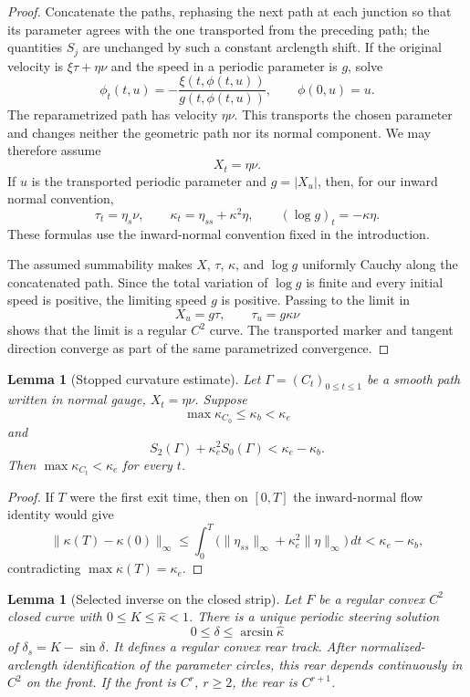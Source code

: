 \documentclass[11pt]{article}
\newtheorem{lemma}[theorem]{Lemma}
\theoremstyle{remark}
\begin{document}
\begin{proof}
Concatenate the paths, rephasing the next path at each junction so that its
parameter agrees with the one transported from the preceding path; the
quantities \(S_j\) are unchanged by such a constant arclength shift.  If the
original velocity is \(\xi\tau+\eta\nu\) and the speed in a periodic
parameter is \(g\), solve
\[
   \phi_t(t,u)=-\frac{\xi(t,\phi(t,u))}{g(t,\phi(t,u))},
   \qquad \phi(0,u)=u.
\]
The reparametrized path has velocity \(\eta\nu\).  This transports the
chosen parameter and changes neither the geometric path nor its normal
component.  We may therefore assume
\[
   X_t=\eta\nu.
\]
If \(u\) is the transported periodic parameter and \(g=|X_u|\), then, for
our inward normal convention,
\begin{equation}\label{eq:normal-flow-identities}
   \tau_t=\eta_s\nu,
   \qquad
   \kappa_t=\eta_{ss}+\kappa^2\eta,
   \qquad
   (\log g)_t=-\kappa\eta.
\end{equation}
These formulas use the inward-normal convention fixed in the introduction.

The assumed summability makes \(X\), \(\tau\), \(\kappa\), and \(\log g\)
uniformly Cauchy along the concatenated path.  Since the total variation of
\(\log g\) is finite and every initial speed is positive, the limiting speed
\(g\) is positive.  Passing to the limit in
\[
   X_u=g\tau,
   \qquad
   \tau_u=g\kappa\nu
\]
shows that the limit is a regular \(C^2\) curve.  The transported marker and
tangent direction converge as part of the same parametrized convergence.
\end{proof}

\begin{lemma}[Stopped curvature estimate]\label{lem:stopped-curvature}
Let \(\Gamma=(C_t)_{0\leq t\leq1}\) be a smooth path written in normal
gauge, \(X_t=\eta\nu\).  Suppose
\[
 \max\kappa_{C_0}\leq\kappa_b<\kappa_e
\]
and
\[
 S_2(\Gamma)+\kappa_e^2S_0(\Gamma)
 <\kappa_e-\kappa_b.
\]
Then \(\max\kappa_{C_t}<\kappa_e\) for every \(t\).
\end{lemma}

\begin{proof}
If \(T\) were the first exit time, then on \([0,T]\) the inward-normal
flow identity would give
\[
 \|\kappa(T)-\kappa(0)\|_\infty
 \leq\int_0^T
   \bigl(\|\eta_{ss}\|_\infty+
         \kappa_e^2\|\eta\|_\infty\bigr)\,dt
 <\kappa_e-\kappa_b,
\]
contradicting \(\max\kappa(T)=\kappa_e\).
\end{proof}

\begin{lemma}[Selected inverse on the closed strip]\label{lem:closed-strip-inverse}
Let \(F\) be a regular convex \(C^2\) closed curve with
\(0\leq K\leq\widehat\kappa<1\).  There is a unique periodic steering
solution
\[
 0\leq\delta\leq\arcsin\widehat\kappa
\]
of \(\delta_s=K-\sin\delta\).  It defines a regular convex rear track.
After normalized-arclength identification of the parameter circles, this
rear depends continuously in \(C^2\) on the front.  If the front is
\(C^r\), \(r\geq2\), the rear is \(C^{r+1}\).
\end{lemma}
\end{document}
